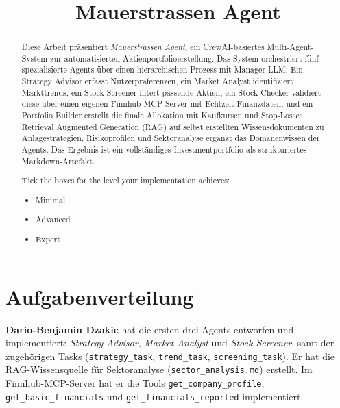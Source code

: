 \documentclass[conference]{IEEEtran}
\begin{document}
\title{Mauerstrassen Agent}

\author{
}

\maketitle

\begin{abstract}
Diese Arbeit präsentiert \emph{Mauerstrassen Agent}, ein
CrewAI-basiertes Multi-Agent-System zur automatisierten
Aktienportfolioerstellung. Das System orchestriert fünf spezialisierte
Agents über einen hierarchischen Prozess mit Manager-LLM: Ein Strategy
Advisor erfasst Nutzerpräferenzen, ein Market Analyst identifiziert
Markttrends, ein Stock Screener filtert passende Aktien, ein Stock
Checker validiert diese über einen eigenen Finnhub-MCP-Server mit
Echtzeit-Finanzdaten, und ein Portfolio Builder erstellt die finale
Allokation mit Kaufkursen und Stop-Losses. Retrieval Augmented
Generation (RAG) auf selbst erstellten Wissensdokumenten zu
Anlagestrategien, Risikoprofilen und Sektoranalyse ergänzt das
Domänenwissen der Agents. Das Ergebnis ist ein vollständiges
Investmentportfolio als strukturiertes Markdown-Artefakt.

\medskip
Tick the boxes for the level your implementation achieves:

\begin{itemize}
    \item[$\square$] Minimal
    \item[$\square$] Advanced
    \item[$\boxtimes$] Expert
\end{itemize}

\end{abstract}

\section{Aufgabenverteilung}

\textbf{Dario-Benjamin Dzakic} hat die ersten drei Agents entworfen und
implementiert: \emph{Strategy Advisor}, \emph{Market Analyst} und
\emph{Stock Screener}, samt der zugehörigen Tasks
(\texttt{strategy\_task}, \texttt{trend\_task},
\texttt{screening\_task}). Er hat die RAG-Wissensquelle für
Sektoranalyse (\texttt{sector\_analysis.md}) erstellt. Im
Finnhub-MCP-Server hat er die Tools
\texttt{get\_company\_profile},
\texttt{get\_basic\_financials} und
\texttt{get\_financials\_reported} implementiert.
\end{document}
